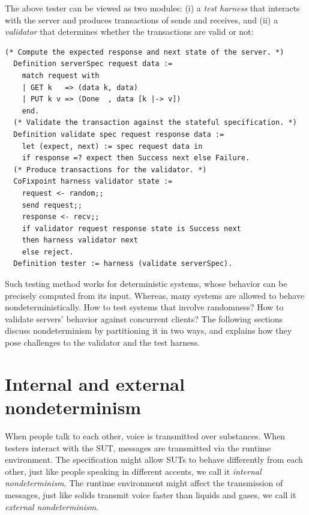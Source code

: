 The above tester can be viewed as two modules: (i) a {\em test harness} that
interacts with the server and produces transactions of sends and receives, and
(ii) a {\em validator} that determines whether the transactions are valid or
not:
\begin{lstlisting}[style=customcoq]
  (* Compute the expected response and next state of the server. *)
  Definition serverSpec request data :=
    match request with
    | GET k   => (data k, data)
    | PUT k v => (Done  , data [k |-> v])
    end.
  (* Validate the transaction against the stateful specification. *)
  Definition validate spec request response data :=
    let (expect, next) := spec request data in
    if response =? expect then Success next else Failure.
  (* Produce transactions for the validator. *)
  CoFixpoint harness validator state :=
    request <- random;;
    send request;;
    response <- recv;;
    if validator request response state is Success next
    then harness validator next
    else reject.
  Definition tester := harness (validate serverSpec).
\end{lstlisting}
Such testing method works for deterministic systems, whose behavior can be
precisely computed from its input.  Whereas, many systems are allowed to behave
nondeterministically.  How to test systems that involve randomness?  How to
validate servers' behavior against concurrent clients?  The following sections
discuss nondeterminism by partitioning it in two ways, and explains how they
pose challenges to the validator and the test harness.

\section{Internal and external nondeterminism}
\label{sec:internal-external-nondeterminism}
When people talk to each other, voice is transmitted over substances.  When
testers interact with the SUT, messages are transmitted via the runtime
environment.  The specification might allow SUTs to behave differently from each
other, just like people speaking in different accents, we call it {\em internal
  nondeterminism}.  The runtime environment might affect the transmission of
messages, just like solids transmit voice faster than liquids and gases, we call
it {\em external nondeterminism}.

